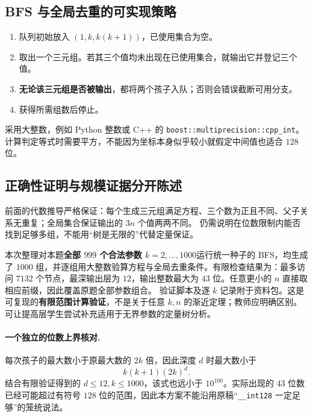 \subsection{BFS 与全局去重的可实现策略}
\begin{enumerate}
\item 队列初始放入 $(1,k,k(k+1))$，已使用集合为空。
\item 取出一个三元组。若其三个值均未出现在已使用集合，就输出它并登记三个值。
\item \textbf{无论该三元组是否被输出}，都将两个孩子入队；否则会错误截断可用分支。
\item 获得所需组数后停止。
\end{enumerate}
采用大整数，例如 Python 整数或 C++ 的 \texttt{boost::multiprecision::cpp\_int}。计算判定等式时需要平方，不能因为坐标本身似乎较小就假定中间值也适合 $128$ 位。

\subsection{正确性证明与规模证据分开陈述}
前面的代数推导严格保证：每个生成三元组满足方程、三个数为正且不同、父子关系无重复；全局集合保证输出的 $3n$ 个值两两不同。
仍需说明在位数限制内能否找到足够多组，不能用“树是无限的”代替定量保证。

本次整理对本题\textbf{全部 $999$ 个合法参数 $k=2,\ldots,1000$}运行统一种子的 BFS，均生成了 $1000$ 组，并逐组用大整数验算方程与全局去重条件。有限检查结果为：最多访问 $7132$ 个节点，最深输出层为 $12$，输出整数最大为 $43$ 位。任意更小的 $n$ 直接取相应前缀，因此覆盖原题全部参数组合。
验证脚本及逐 $k$ 记录附于资料包。这是可复现的\textbf{有限范围计算验证}，不是关于任意 $k,n$ 的渐近定理；教师应明确区别。可让提高层学生尝试补充适用于无界参数的定量树分析。

\paragraph{一个独立的位数上界核对.}
每次孩子的最大数小于原最大数的 $2k$ 倍，因此深度 $d$ 时最大数小于
\[
 k(k+1)(2k)^d.
\]
结合有限验证得到的 $d\le12,k\le1000$，该式也远小于 $10^{100}$。实际出现的 $43$ 位数已经可能超过有符号 $128$ 位的范围，因此本方案不能沿用原稿“\texttt{\_\_int128} 一定足够”的笼统说法。



